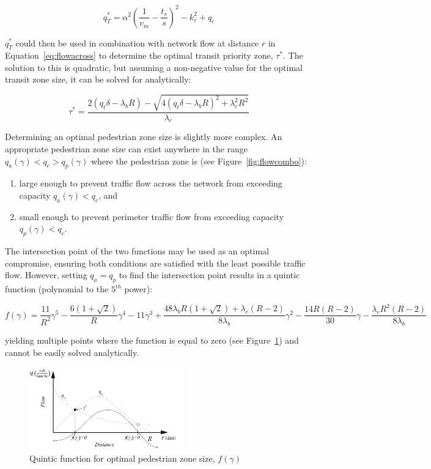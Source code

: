 \documentclass{article}
\begin{document}
\begin{equation}
    q^*_T = \alpha^2 \left( \frac{1}{v_m} - \frac{t_s}{s} \right)^2 - k_c^2 + q_c
\end{equation}

\noindent $q^*_T$ could then be used in combination with network flow at distance $r$ in Equation~\eqref{eq:flowacross} to determine the optimal transit priority zone, $\tau^*$. The solution to this is quadratic, but assuming a non-negative value for the optimal transit zone size, it can be solved for analytically:

\begin{equation}
    \tau^* = \frac{2\left(q_{t}\delta-\lambda_{b}R\right)-\sqrt{4\left(q_{t}\delta-\lambda_{b}R\right)^{2}+\lambda_{c}^{2}R^{2}}}{\lambda_{c}}
\end{equation}

Determining an optimal pedestrian zone size is slightly more complex. An appropriate pedestrian zone size can exist anywhere in the range $q_a(\gamma) < q_c > q_p(\gamma)$ where the pedestrian zone is (see Figure~\ref{fig:flowcombo}):

\begin{enumerate}[label=(\alph*)]
    \item large enough to prevent traffic flow across the network from exceeding capacity $q_a(\gamma) < q_c$, and 
    \item small enough to prevent perimeter traffic flow from exceeding capacity $q_p(\gamma) < q_c$. 
\end{enumerate}

The intersection point of the two functions may be used as an optimal compromise, ensuring both conditions are satisfied with the least possible traffic flow. However, setting $q_a = q_p$ to find the intersection point results in a quintic function (polynomial to the $5^{th}$ power):

\begin{equation}
f(\gamma) = \frac{11}{R^{2}}\gamma^{5}-\frac{6(1+\sqrt{2})}{R}\gamma^{4}-11\gamma^{3}+\frac{48\lambda_{b}R(1+\sqrt{2})+\lambda_{c}(R-2)}{8\lambda_{b}}\gamma^{2}-\frac{14R(R-2)}{30}\gamma-\frac{\lambda_{c}R^{2}(R-2)}{8\lambda_{b}}
\end{equation}

\noindent yielding multiple points where the function is equal to zero (see Figure~\ref{fig:optimalped}) and cannot be easily solved analytically.

\begin{figure}[!ht]
     \centering
     \includegraphics[width=0.6\textwidth]{diagram_optimalped}
     \caption{Quintic function for optimal pedestrian zone size, $f(\gamma)$}
     \label{fig:optimalped}
\end{figure}
\end{document}
